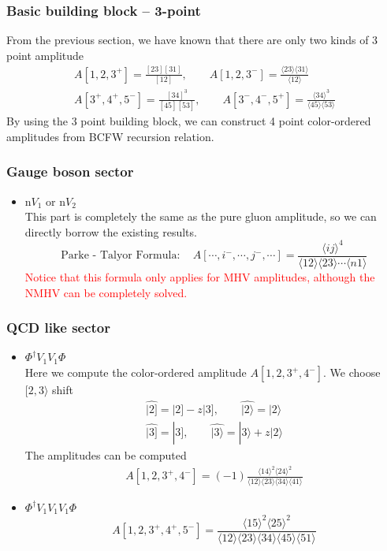 \documentclass{beamer}
\newcommand{\aket}[1]{|#1\rangle}
\newcommand{\sket}[1]{|#1]}
\newcommand{\avg}[1]{\langle #1 \rangle}
\newcommand{\mdavg}[2]{\langle #1 \rangle\!\langle #2 \rangle}
\begin{document}
\begin{frame}
    \frametitle{Basic building block -- 3-point}
    From the previous section, we have known that there are only two kinds of 3 point amplitude
    \begin{gather*}
        A[1,2,3^+]=\frac{[23][31]}{[12]},\qquad A[1,2,3^-]=\frac{\avg{23}\!\avg{31}}{\avg{12}}\\
        A[3^+,4^+,5^-]=\frac{[34]^3}{[45][53]},\qquad A[3^-,4^-,5^+]=\frac{\avg{34}^3}{\avg{45}\!\avg{53}}
    \end{gather*}
    By using the 3 point building block, we can construct 4 point color-ordered amplitudes from BCFW recursion relation.
\end{frame}
\begin{frame}
    \frametitle{Gauge boson sector}
    \begin{itemize}
        \item n$ V_1$ or n$V_2$\\
        This part is completely the same as the pure gluon amplitude, so we can directly borrow the
        existing results.
        \begin{equation*}
            \boxed{\text{Parke - Talyor Formula}:\quad A[\cdots,i^-,\cdots,j^-,\cdots]=\frac{\avg{ij}^4}{\avg{12}\!\avg{23}\cdots\avg{n1}}}
        \end{equation*}
        \textcolor{red}{Notice that this formula only applies for MHV amplitudes, although the NMHV can be completely solved.}
    \end{itemize}
\end{frame}

\begin{frame}
    \frametitle{QCD like sector}
    \begin{itemize}
        \item $\Phi^\dagger V_1V_1\Phi$\\
        Here we compute the color-ordered amplitude $A[1,2,3^+,4^-]$. We choose $[2,3\rangle$ shift
        \begin{gather*}
        \hat{\sket{2}}=\sket{2}-z\sket{3},\qquad \hat{\aket{2}}=\aket{2} \\
        \hat{\sket{3}}=\sket{3},\qquad \hat{\aket{3}}=\aket{3}+z\aket{2}
        \end{gather*}
        The amplitudes can be computed 
        \begin{align*}
            A[1,2,3^+,4^-]=(-1)\frac{\avg{14}^2\avg{24}^2}{\mdavg{12}{23}\!\mdavg{34}{41}}
        \end{align*}
        \item $\Phi^\dagger V_1V_1V_1\Phi$
            \begin{equation*}
                A[1,2,3^+,4^+,5^-]=\frac{\avg{15}^2\!\avg{25}^2}{\mdavg{12}{23}\!\mdavg{34}{45}\!\avg{51}}
            \end{equation*}
    \end{itemize}
\end{frame}
\end{document}
